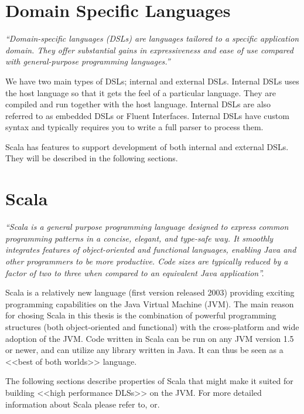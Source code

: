 \documentclass[a4paper,english]{report}
\begin{document}
\chapter{Domain Specific Languages}

\textit{``Domain-specific languages (DSLs) are languages tailored to a
  specific application domain. They offer substantial gains in
  expressiveness and ease of use compared with general-purpose
  programming languages.''}\cite{mer05}

We have two main types of DSLs; internal and external DSLs. Internal
DSLs uses the host language so that it gets the feel of a particular
language. They are compiled and run together with the host
language. Internal DSLs are also referred to as embedded DSLs or
Fluent Interfaces. Internal DSLs have custom syntax and typically
requires you to write a full parser to process them.

Scala has features to support development of both internal and
external DSLs. They will be described in the following sections.

\chapter{Scala}

\textit{``Scala is a general purpose programming language designed to
  express common programming patterns in a concise, elegant, and
  type-safe way. It smoothly integrates features of object-oriented
  and functional languages, enabling Java and other programmers to be
  more productive. Code sizes are typically reduced by a factor of two
  to three when compared to an equivalent Java
  application''.}\cite{scala}

Scala is a relatively new language (first version released
2003\cite{scala}) providing exciting programming capabilities on the
Java Virtual Machine (JVM). The main reason for chosing Scala in this
thesis is the combination of powerful programming structures (both
object-oriented and functional) with the cross-platform and wide
adoption of the JVM. Code written in Scala can be run on any JVM
version 1.5 or newer, and can utilize any library written in Java. It
can thus be seen as a <<best of both worlds>> language.

The following sections describe properties of Scala that might make it
suited for building <<high performance DLSs>> on the JVM. For more
detailed information about Scala please refer
to\cite{ode08},\cite{scala} or\cite{scalatour}.
\end{document}
